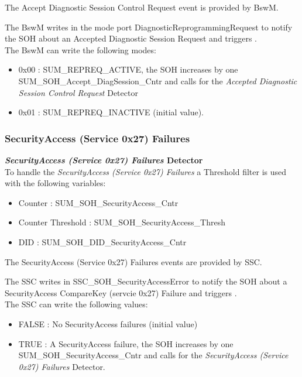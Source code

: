 The Accept Diagnostic Session Control Request event is provided by BswM.

The BswM writes in the mode port DiagnosticReprogrammingRequest to notify the SOH about an Accepted Diagnostic Session Request and triggers .\\
The BswM can write the following modes:
\begin{itemize}
	\item 0x00		:	SUM_REPREQ_ACTIVE, the SOH increases by one SUM_SOH_Accept_DiagSession_Cntr and calls  for the \textit{Accepted Diagnostic Session Control Request} Detector
	\item 0x01		:	SUM_REPREQ_INACTIVE (initial value).
\end{itemize}


\subsubsection{SecurityAccess (Service 0x27) Failures}
{
    \textbf{\textit{SecurityAccess (Service 0x27) Failures} Detector}\\
    To handle the \textit{SecurityAccess (Service 0x27) Failures} a Threshold filter is used  with the following variables:
    \begin{itemize}
        \item Counter               : SUM_SOH_SecurityAccess_Cntr
        \item Counter Threshold     : SUM_SOH_SecurityAccess_Thresh
        \item DID                   : SUM_SOH_DID_SecurityAccess_Cntr
    \end{itemize}
}
{
       
}

The SecurityAccess (Service 0x27) Failures events are provided by SSC.

The SSC writes in SSC_SOH_SecurityAccessError to notify the SOH about a SecurityAccess CompareKey (servcie 0x27) Failure and triggers .\\
The SSC can write the following values:
\begin{itemize}
	\item FALSE		:	No SecurityAccess failures (initial value)
	\item TRUE		:	A SecurityAccess failure, the SOH increases by one SUM_SOH_SecurityAccess_Cntr and calls  for the \textit{SecurityAccess (Service 0x27) Failures} Detector.
\end{itemize}


